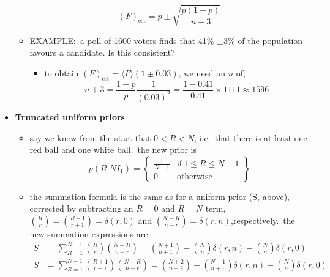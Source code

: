 \documentclass[../jaynes_prob_theory_notes.tex]{subfiles}
\begin{document}
\begin{itemize}
\begin{itemize}
                    \begin{equation*}
                        {(F)}_{\mathrm{est}} = p \pm \sqrt{\frac{p(1-p)}{n+3}}
                    \end{equation*}
                \item EXAMPLE:\ a poll of 1600 voters finds that 41\% $\pm 3$\% of the population favours a candidate. Is this consistent?
                    \begin{itemize}
                        \item to obtain ${(F)}_{\mathrm{est}} = \langle F \rangle (1 \pm 0.03)$, we need an $n$ of,
                            \begin{equation*}
                                n+3 = \frac{1-p}{p} \frac{1}{{(0.03)}^2} = \frac{1-0.41}{0.41} \times 1111 \approx 1596
                            \end{equation*}
                    \end{itemize}
            \end{itemize}
        \item \textbf{Truncated uniform priors}
            \begin{itemize}
                \item say we know from the start that $0 < R < N$, i.e.\ that there is at least one red ball and one white ball.\ the new prior is
                    \begin{equation*}
                        p(R|NI_1) = \left \{ \begin{matrix} \frac{1}{N-1} & \mathrm{if}~1 \leq R \leq N-1 \\ 0 & \mathrm{otherwise} \end{matrix} \right \}
                    \end{equation*}
                \item the summation formula is the same as for a uniform prior (S, above), corrected by subtracting an $R = 0$ and $R = N$ term, $\binom{R}{r} = \binom{R+1}{r+1} = \delta(r,0)$ and $\binom{N-R}{n-r} = \delta(r,n)$,respectively.\ the new summation expressions are
                    \begin{align*}
                        S &= \sum^{N-1}_{R=1} \binom{R}{r} \binom{N-R}{n-r} = \binom{N+1}{n+1} - \binom{N}{n}\delta(r,n) - \binom{N}{n}\delta(r,0) \\
                        S &=  \sum^{N-1}_{R=1} \binom{R+1}{r+1} \binom{N-R}{n-r} = \binom{N+2}{n+2} - \binom{N+1}{n+1}\delta(r,n) - \binom{N}{n}\delta(r,0) 
                    \end{align*}

\end{itemize}
\end{itemize}
\end{document}
